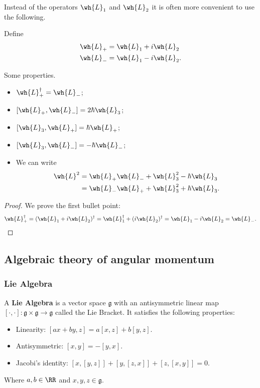 \documentclass[12pt, a4paper]{article}
\begin{document}
\noindent Instead of the operators \(\wh{L}_1\) and \(\wh{L}_2\) it is often more convenient to use the following.

\begin{definition}
    Define
    \[\begin{aligned}
        \wh{L}_{+} &= \wh{L}_1 + i\wh{L}_2  \\
        \wh{L}_{-} &= \wh{L}_1 - i\wh{L}_2.
    \end{aligned}\]
\end{definition}

\begin{mdprop}
    Some properties.
    \begin{itemize}
        \item \(\wh{L}_{+}^\dagger = \wh{L}_{-}\);
        \item \([\wh{L}_{+}, \wh{L}_{-}] = 2\hbar\wh{L}_3\);
        \item \([\wh{L}_3, \wh{L}_{+}] = \hbar\wh{L}_{+}\);
        \item \([\wh{L}_3, \wh{L}_{-}] = -\hbar\wh{L}_{-}\);
        \item We can write
        \[\begin{aligned}
            \wh{L}^2 &= \wh{L}_{+}\wh{L}_{-} + \wh{L}_3^2 - \hbar\wh{L}_3 \\
            &= \wh{L}_{-}\wh{L}_{+} + \wh{L}_3^2 + \hbar\wh{L}_3.
        \end{aligned}\]
    \end{itemize}
\end{mdprop}

\begin{proof}
    We prove the first bullet point:
    \[\wh{L}_{+}^\dagger = (\wh{L}_1 + i\wh{L}_2)^\dagger = \wh{L}_{1}^\dagger + (i\wh{L}_2)^\dagger = \wh{L}_1 - i\wh{L}_2 = \wh{L}_{-}.\]
\end{proof}

\subsection{Algebraic theory of angular momentum}

\subsubsection{Lie Algebra}

\begin{definition}
    A \textbf{Lie Algebra} is a vector space \(\mathfrak{g}\) with an antisymmetric linear map \([\cdot,\cdot] : \mathfrak{g} \times \mathfrak{g} \to \mathfrak{g}\) called the Lie Bracket. It satisfies the following properties:
    \begin{itemize}
        \item Linearity: \([ax+by,z] =a[x,z]+b[y,z]\).
        \item Antisymmetric: \([x,y]=-[y,x]\).
        \item Jacobi's identity: \([x,[y,z]]+[y,[z,x]]+[z,[x,y]]=0\).
    \end{itemize}
    Where \(a,b \in \RR\) and \(x,y,z \in \mathfrak{g}\).
\end{definition}
\end{document}
